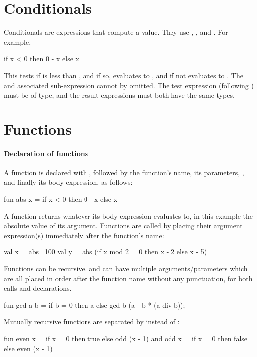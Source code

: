\documentclass[12pt,a4paper]{book}
\begin{document}
\section{Conditionals}

Conditionals are expressions that compute a value. They use ,
, and . For example,
\begin{smlcode}
if x < 0 then 0 - x else x
\end{smlcode}
This tests if  is less than , and if so, evaluates to , and if not evaluates to .
The  and associated sub-expression cannot by omitted. The test expression (following ) must be of  type, and the result expressions must both have the same types.

\section{Functions}
\label{sect:func}

\paragraph{Declaration of functions}
A function is declared with , followed by the
function's name, its parameters, \smlinline{=}, and finally its body expression, as follows:
\begin{smlcode}
fun abs x =
  if x < 0 then 0 - x else x
\end{smlcode}
A function returns whatever its body expression evaluates
to, in this example the absolute value of its argument. Functions are called by placing
their argument expression(s) immediately after the function's name:
\begin{smlcode}
val x = abs ~100
val y = abs (if x mod 2 = 0 then x - 2 else x - 5)
\end{smlcode}

Functions can be recursive, and can have multiple arguments/parameters which are all placed in
order after the function name without any punctuation, for both calls and declarations.
\begin{smlcode}
fun gcd a b =
  if b = 0 then
    a
  else
    gcd b (a - b * (a div b));
\end{smlcode}

Mutually recursive functions are separated by  instead of :
\begin{smlcode}
fun even x =
  if x = 0 then true
  else odd (x - 1)
and odd x =
  if x = 0 then false
  else even (x - 1)
\end{smlcode}
\end{document}

